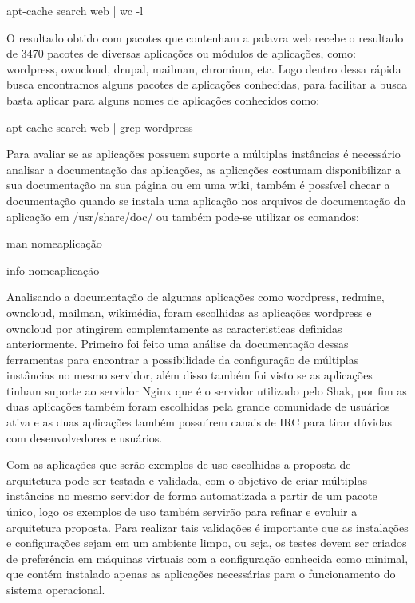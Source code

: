 \begin{center}
apt-cache search web | wc -l
\end{center}

O resultado obtido com pacotes que contenham a palavra web recebe o resultado de 3470
pacotes de diversas aplicações ou módulos de aplicações, como:
wordpress, owncloud, drupal, mailman, chromium, etc. Logo dentro dessa rápida busca
encontramos alguns pacotes de aplicações conhecidas, para facilitar a busca basta
aplicar para alguns nomes de aplicações conhecidos como:

\begin{center}
apt-cache search web | grep wordpress
\end{center}

Para avaliar se as aplicações possuem suporte a múltiplas instâncias é necessário
analisar a documentação das aplicações, as aplicações costumam disponibilizar a sua
documentação na sua página ou em uma wiki, também é possível checar a documentação
quando se instala uma aplicação nos arquivos de documentação da aplicação em
/usr/share/doc/ ou também pode-se utilizar os comandos:

\begin{center}
man nomeaplicação

info nomeaplicação
\end{center}

Analisando a documentação de algumas aplicações como wordpress, redmine,
owncloud, mailman, wikimédia, foram escolhidas as aplicações wordpress e owncloud por
atingirem complemtamente as caracteristicas definidas anteriormente. Primeiro
foi feito uma análise da documentação dessas ferramentas para encontrar a
possibilidade da configuração de múltiplas instâncias no mesmo servidor, além
disso também foi visto se as aplicações tinham suporte ao servidor Nginx que é
o servidor utilizado pelo Shak, por fim as duas aplicações também foram escolhidas
pela grande comunidade de usuários ativa e as duas aplicações também possuírem
canais de IRC para tirar dúvidas com desenvolvedores e usuários.

Com as aplicações que serão exemplos de uso escolhidas a proposta de arquitetura
pode ser testada e validada, com o objetivo de criar múltiplas instâncias
no mesmo servidor de forma automatizada a partir de um pacote único, logo os
exemplos de uso também servirão para refinar e evoluir a arquitetura proposta.
Para realizar tais validações é importante que as instalações e configurações
sejam em um ambiente limpo, ou seja, os testes devem ser criados de preferência
em máquinas virtuais com a configuração conhecida como minimal, que contém
instalado apenas as aplicações necessárias para o funcionamento do sistema operacional.

